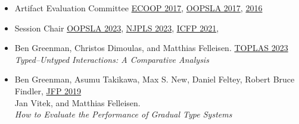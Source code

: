 \documentclass[11pt]{article}
\begin{document}
\begin{itemize}
  \item {Artifact Evaluation Committee} \hfill \href{https://2017.ecoop.org/track/ecoop-2017-Artifacts}{ECOOP 2017},
                                               \href{https://2017.splashcon.org/track/splash-2017-OOPSLA-Artifacts}{OOPSLA 2017},
                                               \href{http://2016.splashcon.org/track/splash-2016-artifacts}{2016}
  \item {Session Chair} \hfill \href{https://2023.splashcon.org/program/program-splash-2023/?date=Wed%2025%20Oct%202023&room=Room%20II}{OOPSLA 2023},
                               \href{https://www.njpls.org/nov2023.html}{NJPLS 2023},
                               \href{https://icfp21.sigplan.org/program/program-icfp-2021/}{ICFP 2021},
\end{itemize}



% 



\begin{itemize}
\item
  Ben Greenman, Christos Dimoulas, and Matthias Felleisen. \hfill \href{https://dl.acm.org/doi/10.1145/3579833}{TOPLAS 2023} \\
  \emph{Typed--Untyped Interactions: A Comparative Analysis}
\item
  Ben Greenman, Asumu Takikawa, Max S. New, Daniel Feltey, Robert Bruce Findler, \hfill \href{https://www.cambridge.org/core/journals/journal-of-functional-programming/article/abs/how-to-evaluate-the-performance-of-gradual-type-systems/DC765724C52A3A462F16C7FB3AD18697}{JFP 2019} \\
  Jan Vitek, and Matthias Felleisen. \\
  \emph{How to Evaluate the Performance of Gradual Type Systems}
\end{itemize}
\end{document}

